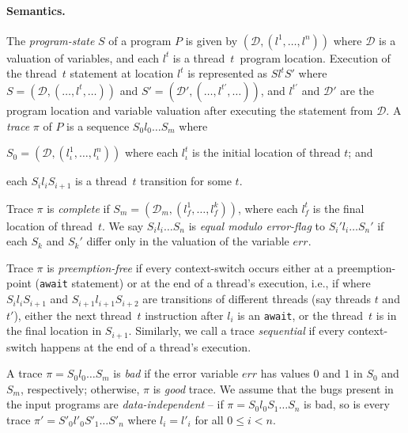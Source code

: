 \documentclass{llncs}
\newcommand\Prog{\ensuremath{\mathit{P}}}
\newcommand\ProgState{\ensuremath{S}}
\newcommand\Valuation{\ensuremath{\mathcal{D}}}
\newcommand\errVar{\ensuremath{\mathit{err}}}
\newcommand\trace{\pi}
\begin{document}
\paragraph{Semantics.}
The {\em program-state} $\ProgState$ of a program $\Prog$ is given by
$(\Valuation, (l^1, \ldots, l^n))$ where $\Valuation$ is a
valuation of variables, and each $l^t$ is a thread~$t$~program location.
Execution of the thread~$t$ statement at location $l^t$ is
represented as $\ProgState l^t \ProgState'$ where
$\ProgState = (\Valuation, (\ldots, l^t, \ldots))$ and
$\ProgState' = (\Valuation', (\ldots, l^{t'}, \ldots))$,
and $l^{t'}$ and $\Valuation'$ are the program location and
variable valuation after executing the statement from $\Valuation$. 
A {\em trace} $\trace$ of $\Prog$ is a sequence $\ProgState_0 l_0
 \ldots \ProgState_m$ where 
\begin{inparaenum}[(a)]
\item $\ProgState_0 = (\Valuation, (l^1_\iota, \ldots,
  l^n_\iota))$ where each $l^t_\iota$ is the initial location of
  thread $t$; and
\item each $\ProgState_i l_i \ProgState_{i+1}$ is a thread~$t$
  transition for some $t$.
\end{inparaenum}
Trace $\trace$ is {\em complete} if $\ProgState_m =
(\Valuation_m, (l_f^1, \ldots, l_f^k))$, where each $l_f^t$ is the
final location of thread~$t$.
We say $\ProgState_i l_i \ldots \ProgState_n$ is {\em equal modulo
error-flag} to $\ProgState_i' l_i \ldots \ProgState_n'$ if each
$\ProgState_k$ and $\ProgState_k'$ differ only in the valuation of the
variable $\errVar$.




Trace $\trace$ is {\em preemption-free} if every context-switch occurs
either at a preemption-point ({\tt await} statement) or at the end of a
thread's execution, i.e., if where $\ProgState_i l_i
\ProgState_{i+1}$ and $\ProgState_{i+1} l_{i+1} \ProgState_{i+2}$ are
transitions of different threads (say threads $t$ and $t'$), either the
next thread~$t$ instruction after $l_i$ is an {\tt await}, or the
thread~$t$ is in the final location in $\ProgState_{i+1}$.
Similarly, we call a trace {\em sequential} if every context-switch
happens at the end of a thread's execution.

A trace $\trace = \ProgState_0 l_0 \ldots \ProgState_m$
is {\em bad} if the error variable $\errVar$ has values $0$ and $1$ in
$\ProgState_0$ and $\ProgState_m$, respectively; otherwise, $\trace$ is
{\em good} trace.
We assume that the bugs present in the input
programs are {\em data-independent} -- if $\trace = \ProgState_0 l_0
\ProgState_1 \ldots \ProgState_n $ is bad, so is every trace $\trace'
=\ProgState'_0 l'_0 \ProgState'_1 \ldots \ProgState'_n $ where
$l_i=l'_i$ for all $0 \leq i < n$.
\end{document}
